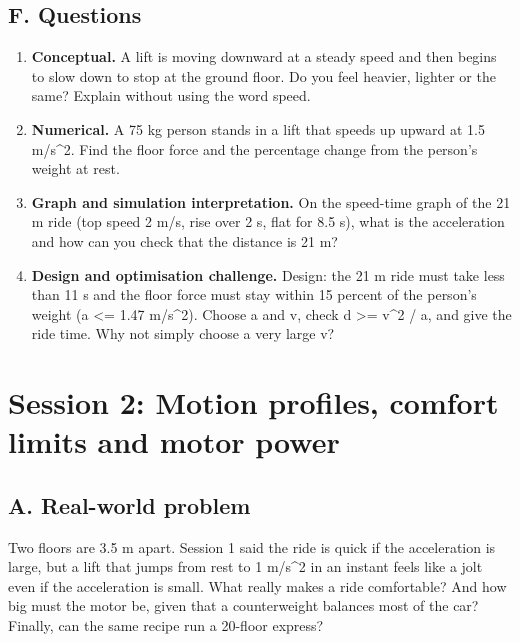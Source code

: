 \documentclass[11pt,a4paper]{article}
\begin{document}
\subsection*{F. Questions}
\begin{enumerate}[nosep]
\item \textbf{Conceptual.} A lift is moving downward at a steady speed and then begins to slow down to stop at the ground floor. Do you feel heavier, lighter or the same? Explain without using the word speed.
\item \textbf{Numerical.} A 75 kg person stands in a lift that speeds up upward at 1.5 m/s\textasciicircum{}2. Find the floor force and the percentage change from the person's weight at rest.
\item \textbf{Graph and simulation interpretation.} On the speed-time graph of the 21 m ride (top speed 2 m/s, rise over 2 s, flat for 8.5 s), what is the acceleration and how can you check that the distance is 21 m?
\item \textbf{Design and optimisation challenge.} Design: the 21 m ride must take less than 11 s and the floor force must stay within 15 percent of the person's weight (a \textless{}= 1.47 m/s\textasciicircum{}2). Choose a and v, check d \textgreater{}= v\textasciicircum{}2 / a, and give the ride time. Why not simply choose a very large v?
\end{enumerate}

\section{Session 2: Motion profiles, comfort limits and motor power}

\subsection*{A. Real-world problem}
Two floors are 3.5 m apart. Session 1 said the ride is quick if the acceleration is large, but a lift that jumps from rest to 1 m/s\textasciicircum{}2 in an instant feels like a jolt even if the acceleration is small. What really makes a ride comfortable? And how big must the motor be, given that a counterweight balances most of the car? Finally, can the same recipe run a 20-floor express?
\end{document}
